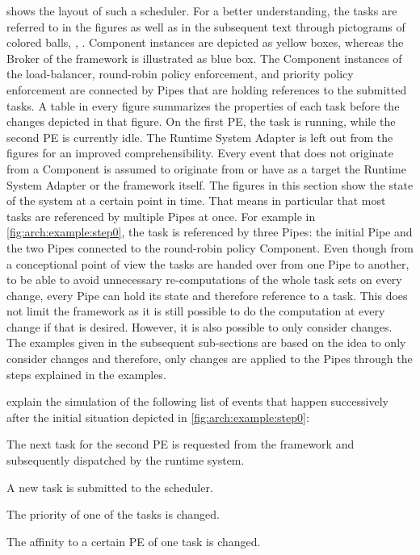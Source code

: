  shows the layout of such a scheduler. For a better understanding, the tasks are referred to in the figures as well as in the subsequent text through pictograms of colored balls, \eg{}, . Component instances are depicted as yellow boxes, whereas the Broker of the \cobas{} framework is illustrated as blue box. The Component instances of the load-balancer, round-robin policy enforcement, and priority policy enforcement are connected by Pipes that are holding references to the submitted tasks. A table in every figure summarizes the properties of each task before the changes depicted in that figure. On the first \ac{PE}, the task  is running, while the second \ac{PE} is currently idle. The Runtime System Adapter is left out from the figures for an improved comprehensibility. Every event that does not originate from a Component is assumed to originate from or have as a target the Runtime System Adapter or the framework itself. The figures in this section show the state of the system at a certain point in time. That means in particular that most tasks are referenced by multiple Pipes at once. For example in \cref{fig:arch:example:step0}, the task  is referenced by three Pipes: the initial Pipe and the two Pipes connected to the round-robin policy Component. Even though from a conceptional point of view the tasks are handed over from one Pipe to another, to be able to avoid unnecessary re-computations of the whole task sets on every change, every Pipe can hold its state and therefore reference to a task. This does not limit the framework as it is still possible to do the computation at every change if that is desired. However, it is also possible to only consider changes. The examples given in the subsequent sub-sections are based on the idea to only consider changes and therefore, only changes are applied to the Pipes through the steps explained in the examples.

 explain the simulation of the following list of events that happen successively after the initial situation depicted in \cref{fig:arch:example:step0}:

\begin{itemize*}
	\item The next task for the second \ac{PE} is requested from the \cobas{} framework and subsequently dispatched by the runtime system.
	\item A new task is submitted to the scheduler.
	\item The priority of one of the tasks is changed.
	\item The affinity to a certain \ac{PE} of one task is changed.
\end{itemize*}

